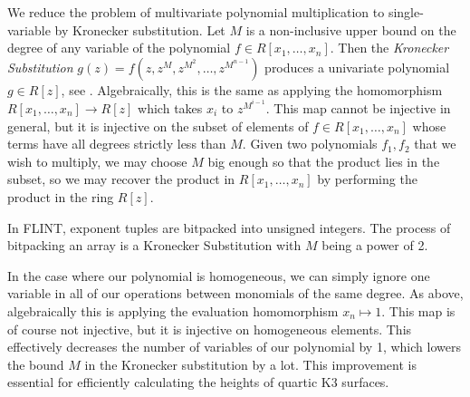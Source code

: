 


We reduce the problem of multivariate polynomial multiplication to single-variable
by Kronecker substitution.
Let $M$ is a non-inclusive upper bound on the degree of any variable of the polynomial
$f \in R[x_1, \dots, x_n]$. 
Then the \textit{Kronecker Substitution} 
\(g(z) = f(z, z^M, z^{M^2}, \dots, z^{M^{n-1}})\)
produces a univariate polynomial $g \in R[z]$,
see \cite{arnold-2014-kronecker}.
Algebraically, this is the same as applying the 
homomorphism 
\(R[x_{1}, \ldots, x_{n}] \xrightarrow{} R[z]\)
which takes \(x_{i}\) to
\(z^{M^{i-1}}\).
This map cannot be injective in general, but it
is injective on the subset of elements of
\(f \in R[x_{1}, \ldots, x_{n}]\) 
whose terms have all degrees strictly less than \(M\).
Given two polynomials \(f_{1}, f_{2}\) that
we wish to multiply, we may choose \(M\)
big enough
so that the product lies in the subset,
so we may recover the product in 
\(R[x_{1}, \ldots, x_{n}]\) by performing
the product in the ring \(R[z]\).

\begin{rmk}
    In FLINT, exponent tuples are bitpacked into unsigned integers. The process of bitpacking an array is a Kronecker Substitution with $M$ being a power of 2.
\end{rmk}

In the case where our polynomial is homogeneous, 
we can simply ignore one variable in all of our operations between monomials of the same degree. 
As above, algebraically this is applying the evaluation
homomorphism \(x_{n} \mapsto 1\).
This map is of course not injective, but it is injective on homogeneous elements.
This effectively decreases the number of variables of our polynomial by 1, 
which lowers the bound \(M\) in the
Kronecker substitution by a lot.
This improvement is essential for efficiently calculating the heights of
quartic K3 surfaces.

